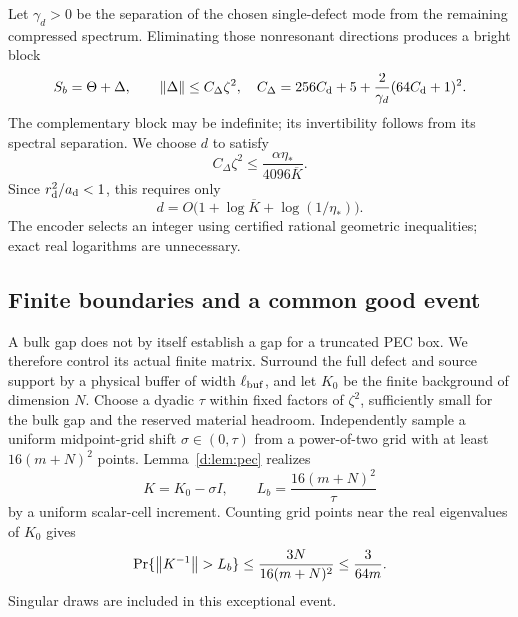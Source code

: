 Let $\gamma_d>0$ be the separation of the chosen single-defect mode from the remaining compressed spectrum. Eliminating those nonresonant directions produces a bright block
\begin{equation}\label{d:eq:bright-error}
 S_b=\Theta+\Delta,\qquad
 \left\lVert \Delta\right\rVert\le C_\Delta\zeta^2,
 \quad C_\Delta=256C_{\rm d}+5+\frac2{\gamma_d}(64C_{\rm d}+1)^2.
\end{equation}
The complementary block may be indefinite; its invertibility follows from its spectral separation. We choose $d$ to satisfy
\begin{equation}\label{d:eq:spacing-budget}
 C_\Delta\zeta^2\le\frac{\alpha\eta_*}{4096\overline K}.
\end{equation}
Since $r_{\rm d}^2/a_{\rm d}<1$, this requires only
\begin{equation}\label{d:eq:log-spacing}
 d=O\bigl(1+\log\overline K+\log(1/\eta_*)\bigr).
\end{equation}
The encoder selects an integer using certified rational geometric inequalities; exact real logarithms are unnecessary.

\subsection{Finite boundaries and a common good event}

A bulk gap does not by itself establish a gap for a truncated PEC box. We therefore control its actual finite matrix. Surround the full defect and source support by a physical buffer of width $\ell_{\rm buf}$, and let $K_0$ be the finite background of dimension $N$. Choose a dyadic $\tau$ within fixed factors of $\zeta^2$, sufficiently small for the bulk gap and the reserved material headroom. Independently sample a uniform midpoint-grid shift $\sigma\in(0,\tau)$ from a power-of-two grid with at least $16(m+N)^2$ points. Lemma~\ref{d:lem:pec} realizes
\begin{equation}\label{d:eq:finite-background}
 K=K_0-\sigma I,\qquad L_b=\frac{16(m+N)^2}{\tau}
\end{equation}
by a uniform scalar-cell increment. Counting grid points near the real eigenvalues of $K_0$ gives
\begin{equation}\label{d:eq:good-event}
 \Pr\{\left\lVert K^{-1}\right\rVert>L_b\}
 \le\frac{3N}{16(m+N)^2}\le\frac3{64m}.
\end{equation}
Singular draws are included in this exceptional event.

